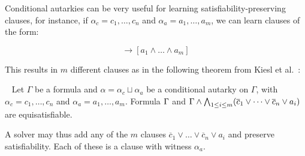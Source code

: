 
Conditional autarkies can be very useful for learning satisfiability-preserving
clauses,
for instance, if $\alpha_c = c_1, \dots, c_n$ and $\alpha_a = a_1, \dots, a_m$,
we can learn clauses of the form:

\begin{equation*}
    [c_1 \land \dots \land c_n] \rightarrow [a_1 \land \dots \land a_m]
\end{equation*}

This results in $m$ different clauses as in the following theorem from Kiesl et
al.~\cite{conditionalautarkies}:

\begin{theorem}~\label{thm:gbcequisat} Let $\Gamma$ be a formula and $\alpha =
    \alpha_c \sqcup \alpha_a$ be a conditional autarky on $\Gamma$, with
    $\alpha_c = c_1, \dots, c_n$ and $\alpha_a = a_1, \dots, a_m$. Formula
    $\Gamma$ and $\Gamma \land \bigwedge_{1 \leq i \leq m} (\overline{c}_1
    \lor \dots \lor \overline{c}_n \lor a_i)$ are equisatisfiable.
\end{theorem}


A solver may thus add any of the $m$ clauses
$\overline{c}_1 \lor \dots \lor \overline{c}_n \lor a_i$ and preserve
satisfiability. Each of these is a \pr clause with witness $\alpha_a$.



   
